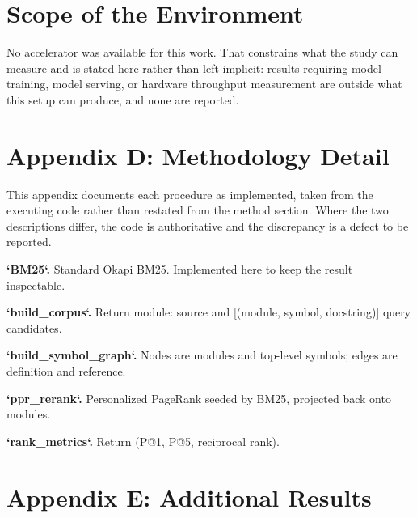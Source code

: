 \documentclass[10pt,journal,compsoc,twocolumn]{IEEEtran}
\begin{document}
\section{Scope of the Environment}


No accelerator was available for this work. That constrains what the study can measure and is stated here rather than left implicit: results requiring model training, model serving, or hardware throughput measurement are outside what this setup can produce, and none are reported.




\section{Appendix D: Methodology Detail}


This appendix documents each procedure as implemented, taken from the executing code rather than restated from the method section. Where the two descriptions differ, the code is authoritative and the discrepancy is a defect to be reported.

\textbf{`BM25`.} Standard Okapi BM25. Implemented here to keep the result inspectable.

\textbf{`build\_corpus`.} Return {module: source} and [(module, symbol, docstring)] query candidates.

\textbf{`build\_symbol\_graph`.} Nodes are modules and top-level symbols; edges are definition and reference.

\textbf{`ppr\_rerank`.} Personalized PageRank seeded by BM25, projected back onto modules.

\textbf{`rank\_metrics`.} Return (P@1, P@5, reciprocal rank).




\section{Appendix E: Additional Results}
\end{document}
